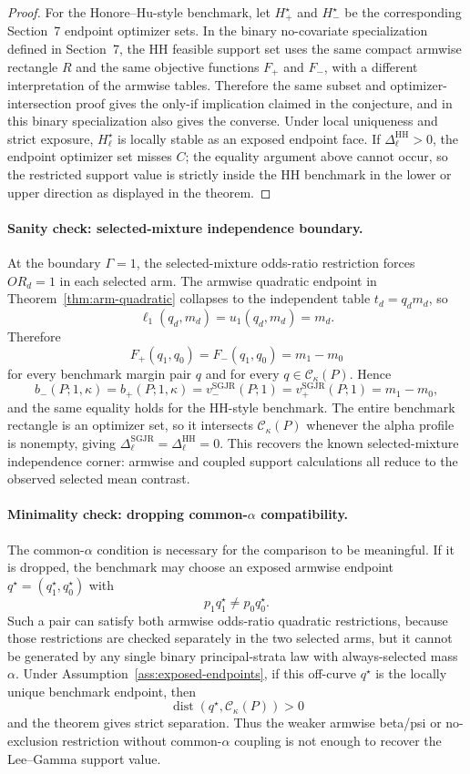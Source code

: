 \begin{proof}
For the Honore--Hu-style benchmark, let \(H_+^\star\) and \(H_-^\star\) be the corresponding Section~7 endpoint optimizer sets.  In the binary no-covariate specialization defined in Section~7, the HH feasible support set uses the same compact armwise rectangle \(R\) and the same objective functions \(F_+\) and \(F_-\), with a different interpretation of the armwise tables.  Therefore the same subset and optimizer-intersection proof gives the only-if implication claimed in the conjecture, and in this binary specialization also gives the converse.  Under local uniqueness and strict exposure, \(H_\ell^\star\) is locally stable as an exposed endpoint face.  If \(\Delta_\ell^{\mathrm{HH}}>0\), the endpoint optimizer set misses \(C\); the equality argument above cannot occur, so the restricted support value is strictly inside the HH benchmark in the lower or upper direction as displayed in the theorem.
\end{proof}

\paragraph{Sanity check: selected-mixture independence boundary.}
At the boundary \(\Gamma=1\), the selected-mixture odds-ratio restriction forces \(OR_d=1\) in each selected arm.  The armwise quadratic endpoint in Theorem~\ref{thm:arm-quadratic} collapses to the independent table \(t_d=q_dm_d\), so
\[
  \ell_1(q_d,m_d)=u_1(q_d,m_d)=m_d.
\]
Therefore
\[
  F_+(q_1,q_0)=F_-(q_1,q_0)=m_1-m_0
\]
for every benchmark margin pair \(q\) and for every \(q\in\mathcal C_\kappa(P)\).  Hence
\[
  b_-(P;1,\kappa)=b_+(P;1,\kappa)=v_-^{\mathrm{SGJR}}(P;1)=v_+^{\mathrm{SGJR}}(P;1)=m_1-m_0,
\]
and the same equality holds for the HH-style benchmark.  The entire benchmark rectangle is an optimizer set, so it intersects \(\mathcal C_\kappa(P)\) whenever the alpha profile is nonempty, giving \(\Delta_\ell^{\mathrm{SGJR}}=\Delta_\ell^{\mathrm{HH}}=0\).  This recovers the known selected-mixture independence corner: armwise and coupled support calculations all reduce to the observed selected mean contrast.

\paragraph{Minimality check: dropping common-\(\alpha\) compatibility.}
The common-\(\alpha\) condition is necessary for the comparison to be meaningful.  If it is dropped, the benchmark may choose an exposed armwise endpoint \(q^\star=(q_1^\star,q_0^\star)\) with
\[
  p_1q_1^\star\ne p_0q_0^\star.
\]
Such a pair can satisfy both armwise odds-ratio quadratic restrictions, because those restrictions are checked separately in the two selected arms, but it cannot be generated by any single binary principal-strata law with always-selected mass \(\alpha\).  Under Assumption~\ref{ass:exposed-endpoints}, if this off-curve \(q^\star\) is the locally unique benchmark endpoint, then
\[
  \operatorname{dist}(q^\star,\mathcal C_\kappa(P))>0
\]
and the theorem gives strict separation.  Thus the weaker armwise beta/psi or no-exclusion restriction without common-\(\alpha\) coupling is not enough to recover the Lee--Gamma support value.
